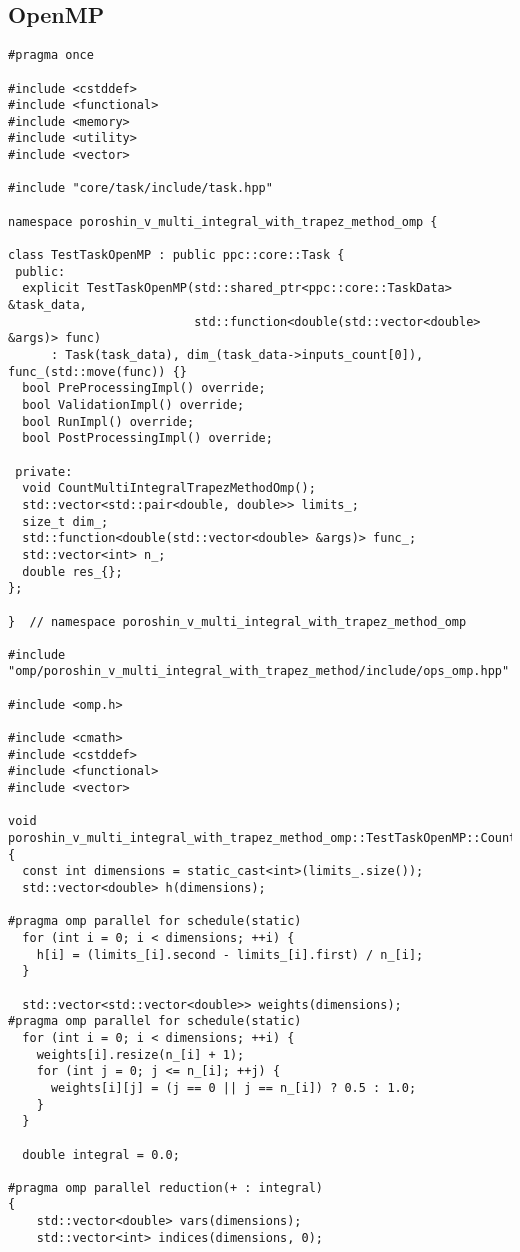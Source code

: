 \documentclass[12pt]{article}
\begin{document}
\subsection*{OpenMP}
\begin{lstlisting}
#pragma once

#include <cstddef>
#include <functional>
#include <memory>
#include <utility>
#include <vector>

#include "core/task/include/task.hpp"

namespace poroshin_v_multi_integral_with_trapez_method_omp {

class TestTaskOpenMP : public ppc::core::Task {
 public:
  explicit TestTaskOpenMP(std::shared_ptr<ppc::core::TaskData> &task_data,
                          std::function<double(std::vector<double> &args)> func)
      : Task(task_data), dim_(task_data->inputs_count[0]), func_(std::move(func)) {}
  bool PreProcessingImpl() override;
  bool ValidationImpl() override;
  bool RunImpl() override;
  bool PostProcessingImpl() override;

 private:
  void CountMultiIntegralTrapezMethodOmp();
  std::vector<std::pair<double, double>> limits_;
  size_t dim_;
  std::function<double(std::vector<double> &args)> func_;
  std::vector<int> n_;
  double res_{};
};

}  // namespace poroshin_v_multi_integral_with_trapez_method_omp

#include "omp/poroshin_v_multi_integral_with_trapez_method/include/ops_omp.hpp"

#include <omp.h>

#include <cmath>
#include <cstddef>
#include <functional>
#include <vector>

void poroshin_v_multi_integral_with_trapez_method_omp::TestTaskOpenMP::CountMultiIntegralTrapezMethodOmp() {
  const int dimensions = static_cast<int>(limits_.size());
  std::vector<double> h(dimensions);

#pragma omp parallel for schedule(static)
  for (int i = 0; i < dimensions; ++i) {
    h[i] = (limits_[i].second - limits_[i].first) / n_[i];
  }

  std::vector<std::vector<double>> weights(dimensions);
#pragma omp parallel for schedule(static)
  for (int i = 0; i < dimensions; ++i) {
    weights[i].resize(n_[i] + 1);
    for (int j = 0; j <= n_[i]; ++j) {
      weights[i][j] = (j == 0 || j == n_[i]) ? 0.5 : 1.0;
    }
  }

  double integral = 0.0;

#pragma omp parallel reduction(+ : integral)
{
    std::vector<double> vars(dimensions);
    std::vector<int> indices(dimensions, 0);


\end{lstlisting}
\end{document}
